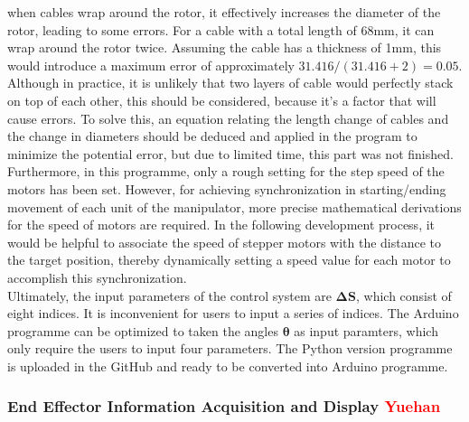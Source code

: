 when cables wrap around the rotor, it effectively increases the diameter of the rotor, leading to some errors. For a 
cable with a total length of 68mm, it can wrap around the rotor twice. Assuming the cable has a thickness of 1mm, this 
would introduce a maximum error of approximately $ 31.416 / (31.416 + 2) = 0.05 $. Although in practice, it is unlikely 
that two layers of cable would perfectly stack on top of each other, this should be considered, because it's a factor 
that will cause errors. To solve this, an equation relating the length change of cables and the change in diameters 
should be deduced and applied in the program to minimize the potential error, but due to limited time, this part was 
not finished.\\
Furthermore, in this programme, only a rough setting for the step speed of the motors has been set. However, for 
achieving synchronization in starting/ending movement of each unit of the manipulator, more precise mathematical 
derivations for the speed of motors are required. In the following development process, it would be helpful to 
associate the speed of stepper motors with the distance to the target position, thereby dynamically setting a 
speed value for each motor to accomplish this synchronization. \\
Ultimately, the input parameters of the control system are $\boldsymbol{\Delta S}$, which consist of eight indices. 
It is inconvenient for users to input a series of indices. The Arduino programme can be optimized to taken the 
angles $\boldsymbol{\theta}$ as input paramters, which only require the users to input four parameters. The Python 
version programme is uploaded in the GitHub and ready to be converted into Arduino programme.\\
\subsubsection{End Effector Information Acquisition and Display \textcolor{red}{Yuehan}}


\newpage